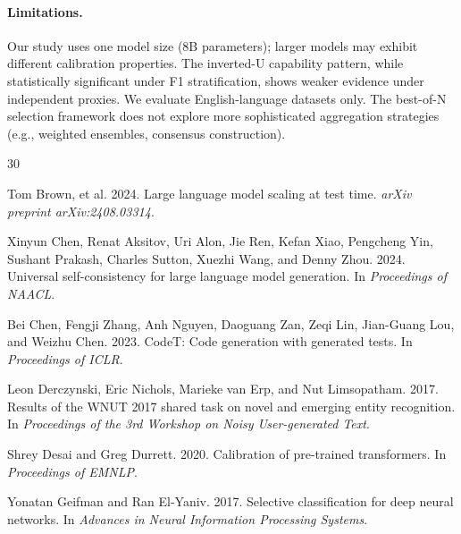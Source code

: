 \documentclass[11pt,a4paper]{article}
\begin{document}
\paragraph{Limitations.}
Our study uses one model size (8B parameters); larger models may exhibit different calibration properties.
The inverted-U capability pattern, while statistically significant under F1 stratification, shows weaker evidence under independent proxies.
We evaluate English-language datasets only.
The best-of-N selection framework does not explore more sophisticated aggregation strategies (e.g., weighted ensembles, consensus construction).



\begin{thebibliography}{30}

Tom Brown, et al. 2024.
\newblock Large language model scaling at test time.
\newblock \emph{arXiv preprint arXiv:2408.03314}.

Xinyun Chen, Renat Aksitov, Uri Alon, Jie Ren, Kefan Xiao, Pengcheng Yin, Sushant Prakash, Charles Sutton, Xuezhi Wang, and Denny Zhou. 2024.
\newblock Universal self-consistency for large language model generation.
\newblock In \emph{Proceedings of NAACL}.

Bei Chen, Fengji Zhang, Anh Nguyen, Daoguang Zan, Zeqi Lin, Jian-Guang Lou, and Weizhu Chen. 2023.
\newblock CodeT: Code generation with generated tests.
\newblock In \emph{Proceedings of ICLR}.

Leon Derczynski, Eric Nichols, Marieke van Erp, and Nut Limsopatham. 2017.
\newblock Results of the WNUT 2017 shared task on novel and emerging entity recognition.
\newblock In \emph{Proceedings of the 3rd Workshop on Noisy User-generated Text}.

Shrey Desai and Greg Durrett. 2020.
\newblock Calibration of pre-trained transformers.
\newblock In \emph{Proceedings of EMNLP}.

Yonatan Geifman and Ran El-Yaniv. 2017.
\newblock Selective classification for deep neural networks.
\newblock In \emph{Advances in Neural Information Processing Systems}.


\end{thebibliography}
\end{document}
